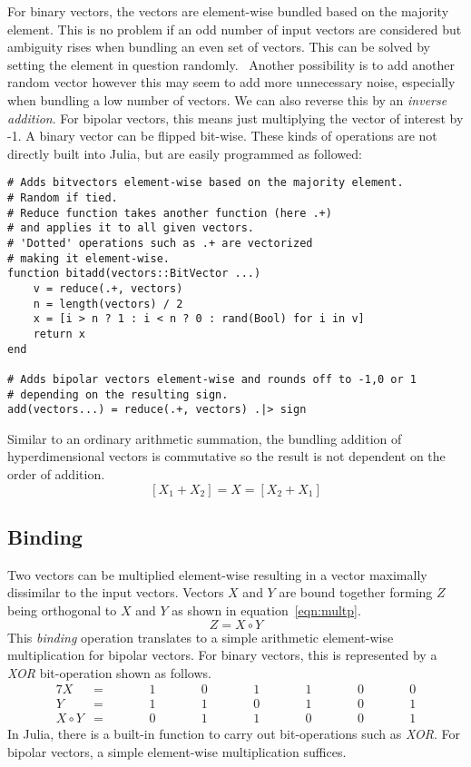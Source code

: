 For binary vectors, the vectors are element-wise bundled based on the majority element. This is no problem if an odd number of input vectors are considered but ambiguity rises when bundling an even set of vectors. This can be solved by setting the element in question randomly.~\cite{binBund} Another possibility is to add another random vector however this may seem to add more unnecessary noise, especially when bundling a low number of vectors. We can also reverse this by an \textit{inverse addition}. For bipolar vectors, this means just multiplying the vector of interest by -1. A binary vector can be flipped bit-wise. These kinds of operations are not directly built into Julia, but are easily programmed as followed:

\begin{verbatim}
# Adds bitvectors element-wise based on the majority element.
# Random if tied.
# Reduce function takes another function (here .+)
# and applies it to all given vectors.
# 'Dotted' operations such as .+ are vectorized
# making it element-wise.
function bitadd(vectors::BitVector ...)
    v = reduce(.+, vectors)            
    n = length(vectors) / 2
    x = [i > n ? 1 : i < n ? 0 : rand(Bool) for i in v]
    return x
end

# Adds bipolar vectors element-wise and rounds off to -1,0 or 1
# depending on the resulting sign.
add(vectors...) = reduce(.+, vectors) .|> sign
\end{verbatim}
Similar to an ordinary arithmetic summation, the bundling addition of hyperdimensional vectors is commutative so the result is not dependent on the order of addition.
\begin{equation}
    \label{eqn:sumcom}
    [X_{1} + X_{2}] = X = [X_{2} + X_{1}]
\end{equation}
\subsection*{Binding} \label{sssec:mult}
Two vectors can be multiplied element-wise resulting in a vector maximally dissimilar to the input vectors. Vectors $X$ and $Y$ are bound together forming $Z$ being orthogonal to $X$ and $Y$ as shown in equation~\ref{eqn:multp}.
\begin{equation}
    \label{eqn:multp}
    Z = X \circ Y
\end{equation}
This \textit{binding} operation translates to a simple arithmetic element-wise multiplication for bipolar vectors. For binary vectors, this is represented by a \textit{XOR} bit-operation shown as follows.
\begin{alignat*}{7}
    X &= && \qquad 1 && \qquad 0 && \qquad 1 && \qquad 1 && \qquad 0 && \qquad 0 \\
    Y &= && \qquad 1 && \qquad 1 && \qquad 0 && \qquad 1 && \qquad 0 && \qquad 1 \\
    \hline
    X \circ Y &= && \qquad 0 && \qquad 1 && \qquad 1 &&  \qquad 0 && \qquad 0 && \qquad 1
\end{alignat*}
In Julia, there is a built-in function to carry out bit-operations such as \textit{XOR}. For bipolar vectors, a simple element-wise multiplication suffices.

